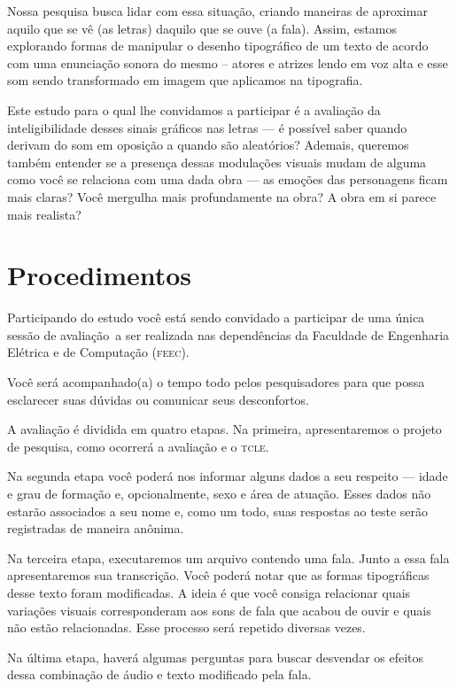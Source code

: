 \documentclass[a4paper,11pt,titlepage,singlespacing]{article}
\begin{document}
Nossa pesquisa busca lidar com essa situação, criando maneiras de aproximar aquilo que se vê (as letras) daquilo que se ouve (a fala). Assim, estamos explorando formas de manipular o desenho tipográfico de um texto de acordo com uma enunciação sonora do mesmo – atores e atrizes lendo em voz alta e esse som sendo transformado em imagem que aplicamos na tipografia.

Este estudo para o qual lhe convidamos a participar é a avaliação da inteligibilidade desses sinais gráficos nas letras — é possível saber quando derivam do som em oposição a quando são aleatórios? Ademais, queremos também entender se a presença dessas modulações visuais mudam de alguma como você se relaciona com uma dada obra — as emoções das personagens ficam mais claras? Você mergulha mais profundamente na obra? A obra em si parece mais realista?

\section*{Procedimentos}

\noindent Participando do estudo você está sendo convidado a participar de uma única sessão de avaliação\, a ser realizada nas dependências da Faculdade de Engenharia Elétrica e de Computação (\textsc{feec}).

Você será acompanhado(a) o tempo todo pelos pesquisadores para que possa esclarecer suas dúvidas ou comunicar seus desconfortos.

A avaliação é dividida em quatro etapas. Na primeira, apresentaremos o projeto de pesquisa, como ocorrerá a avaliação e o \textsc{tcle}.

Na segunda etapa você poderá nos informar alguns dados a seu respeito — idade e grau de formação e, opcionalmente, sexo e área de atuação. Esses dados não estarão associados a seu nome e, como um todo, suas respostas ao teste serão registradas de maneira anônima.

Na terceira etapa, executaremos um arquivo contendo uma fala. Junto a essa fala apresentaremos sua transcrição. Você poderá notar que as formas tipográficas desse texto foram modificadas. A ideia é que você consiga relacionar quais variações visuais corresponderam aos sons de fala que acabou de ouvir e quais não estão relacionadas. Esse processo será repetido diversas vezes.

Na última etapa, haverá algumas perguntas para buscar desvendar os efeitos dessa combinação de áudio e texto modificado pela fala.
\end{document}
